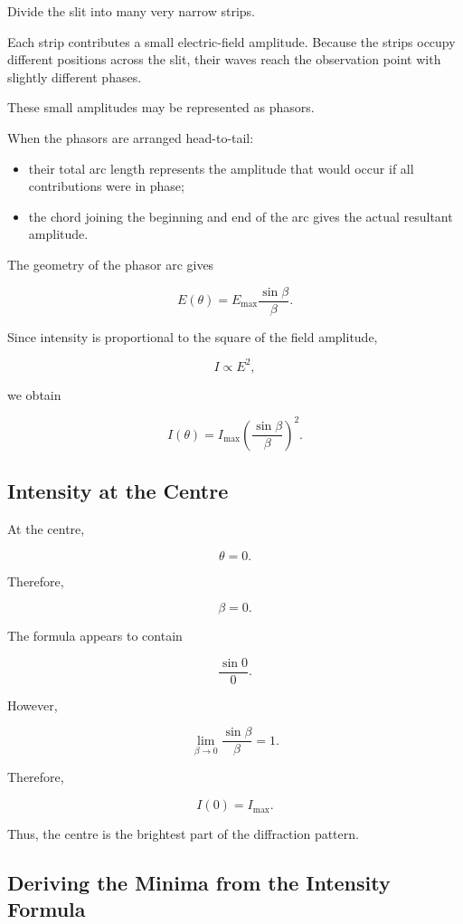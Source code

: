 \documentclass{studentnotes}
\begin{document}
Divide the slit into many very narrow strips.

Each strip contributes a small electric-field amplitude. Because the strips occupy different positions across the slit, their waves reach the observation point with slightly different phases.

These small amplitudes may be represented as phasors.

When the phasors are arranged head-to-tail:

\begin{itemize}
    \item their total arc length represents the amplitude that would occur if all contributions were in phase;
    \item the chord joining the beginning and end of the arc gives the actual resultant amplitude.
\end{itemize}

The geometry of the phasor arc gives

\[
    E(\theta)
    =
    E_{\max}
    \frac{\sin\beta}{\beta}.
\]

Since intensity is proportional to the square of the field amplitude,

\[
    I\propto E^2,
\]

we obtain

\[
    I(\theta)
    =
    I_{\max}
        {\left(
            \frac{\sin\beta}{\beta}
            \right)}^2.
\]

\subsection{Intensity at the Centre}

At the centre,

\[
    \theta=0.
\]

Therefore,

\[
    \beta=0.
\]

The formula appears to contain

\[
    \frac{\sin0}{0}.
\]

However,

\[
    \lim_{\beta\to0}
    \frac{\sin\beta}{\beta}
    =
    1.
\]

Therefore,

\[
    I(0)=I_{\max}.
\]

Thus, the centre is the brightest part of the diffraction pattern.

\subsection{Deriving the Minima from the Intensity Formula}
\end{document}
